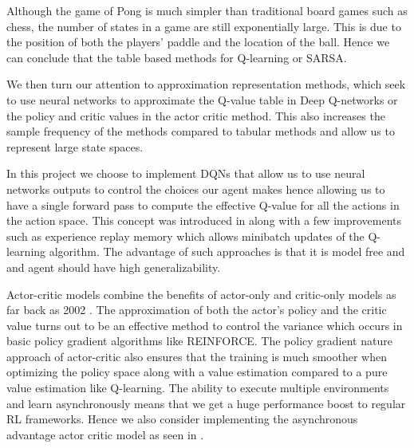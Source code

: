 Although the game of Pong is much simpler than traditional board games such as chess, the number of states in a game are still exponentially large. This is due to the position of both the players' paddle and the location of the ball. Hence we can conclude that the table based methods for Q-learning or SARSA. 

\medskip
\noindent
We then turn our attention to approximation representation methods, which seek to use neural networks to approximate the Q-value table in Deep Q-networks or the policy and critic values in the actor critic method. This also increases the sample frequency of the methods compared to tabular methods and allow us to represent large state spaces.

\medskip
\noindent
In this project we choose to implement DQNs that allow us to use neural networks outputs to control the choices our agent makes hence allowing us to have a single forward pass to compute the effective Q-value for all the actions in the action space. This concept was introduced in \cite{Atari_Breakout} along with a few improvements such as experience replay memory which allows minibatch updates of the Q-learning algorithm. The advantage of such approaches is that it is model free and and agent should have high generalizability.

\medskip
\noindent
Actor-critic models combine the benefits of actor-only and critic-only models as far back as 2002 \cite{orig_a3c}. The approximation of both the actor's policy and the critic value turns out to be an effective method to control the variance which occurs in basic policy gradient algorithms like REINFORCE. The policy gradient nature approach of actor-critic also ensures that the training is much smoother when optimizing the policy space along with a value estimation compared to a pure value estimation like Q-learning. The ability to execute multiple environments and learn asynchronously means that we get a huge performance boost to regular RL frameworks. Hence we also consider implementing the asynchronous advantage actor critic model as seen in \cite{A3C}.